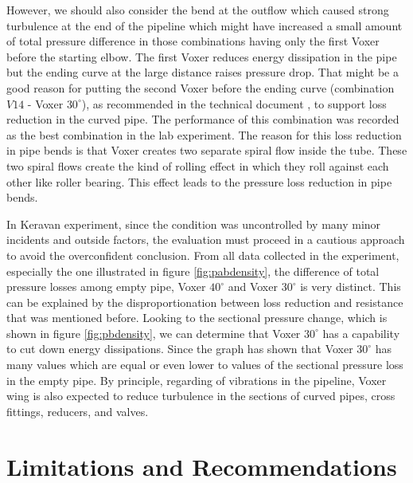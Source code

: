 However, we should also consider the bend at the outflow which caused strong turbulence at the end of the pipeline which might have increased a small amount of total pressure difference in those combinations having only the first Voxer before the starting elbow. The first Voxer reduces energy dissipation in the pipe but the ending curve at the large distance raises pressure drop. That might be a good reason for putting the second Voxer before the ending curve (combination $V14$ - Voxer $30^{\circ}$), as recommended in the technical document \cite{voxer:article}, to support loss reduction in the curved pipe. The performance of this combination was recorded as the best combination in the lab experiment. The reason for this loss reduction in pipe bends is that Voxer creates two separate spiral flow inside the tube. These two spiral flows create the kind of rolling effect in which they roll against each other like roller bearing. This effect leads to the pressure loss reduction in pipe bends.

In Keravan experiment, since the condition was uncontrolled by many minor incidents and outside factors, the evaluation must proceed in a cautious approach to avoid the overconfident conclusion. From all data collected in the experiment, especially the one illustrated in figure \vref{fig:pabdensity}, the difference of total pressure losses among empty pipe, Voxer $40^{\circ}$ and Voxer $30^{\circ}$ is very distinct. This can be explained by the disproportionation between loss reduction and resistance that was mentioned before. Looking to the sectional pressure change, which is shown in figure \vref{fig:pbdensity}, we can determine that Voxer $30^{\circ}$ has a capability to cut down energy dissipations. Since the graph has shown that Voxer $30^{\circ}$ has many values which are equal or even lower to values of the sectional pressure loss in the empty pipe. By principle, regarding of vibrations in the pipeline, Voxer wing is also expected to reduce turbulence in the sections of curved pipes, cross fittings, reducers, and valves. 

\section{Limitations and Recommendations}


